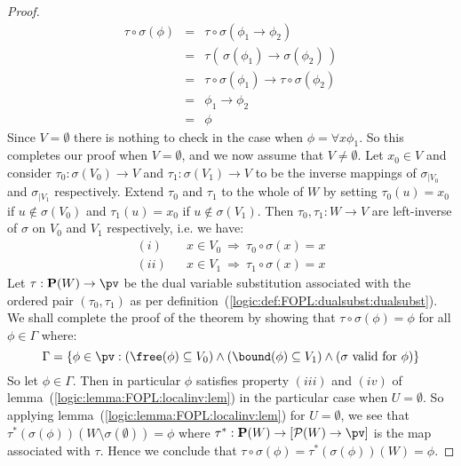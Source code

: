 \begin{proof}
    \begin{eqnarray*}
    \tau\circ\sigma(\phi)&=&\tau\circ\sigma(\phi_{1}\to\phi_{2})\\
    &=&\tau(\,\sigma(\phi_{1})\to\sigma(\phi_{2})\,)\\
    &=&\tau\circ\sigma(\phi_{1})\to\tau\circ\sigma(\phi_{2})\\
    &=&\phi_{1}\to\phi_{2}\\
    &=&\phi
    \end{eqnarray*}
Since $V=\emptyset$ there is nothing to check in the case when
$\phi=\forall x\phi_{1}$. So this completes our proof when
$V=\emptyset$, and we now assume that $V\neq\emptyset$. Let
$x_{0}\in V$ and consider $\tau_{0}:\sigma(V_{0})\to V$ and
$\tau_{1}:\sigma(V_{1})\to V$ to be the inverse mappings of
$\sigma_{|V_{0}}$ and $\sigma_{|V_{1}}$ respectively. Extend
$\tau_{0}$ and $\tau_{1}$ to the whole of $W$ by setting
$\tau_{0}(u)=x_{0}$ if $u\not\in\sigma(V_{0})$ and
$\tau_{1}(u)=x_{0}$ if $u\not\in\sigma(V_{1})$. Then $\tau_{0},
\tau_{1}:W\to V$ are left-inverse of $\sigma$ on $V_{0}$ and $V_{1}$
respectively, i.e. we have:
    \begin{eqnarray*}
    (i)&&x\in V_{0}\ \Rightarrow\ \tau_{0}\circ\sigma(x)=x\\
    (ii)&&x\in V_{1}\ \Rightarrow\ \tau_{1}\circ\sigma(x)=x
    \end{eqnarray*}
Let $\tau:{\bf P}(W)\to\pv$ be the dual variable substitution
associated with the ordered pair $(\tau_{0},\tau_{1})$ as per
definition~(\ref{logic:def:FOPL:dualsubst:dualsubst}). We shall
complete the proof of the theorem by showing that
$\tau\circ\sigma(\phi)=\phi$ for all $\phi\in\Gamma$ where:
    \[
    \Gamma=\{\phi\in\pv:(\free(\phi)\subseteq
    V_{0})\land(\bound(\phi)\subseteq V_{1})\land(\mbox{$\sigma$
    valid for $\phi$})\}
    \]
So let $\phi\in\Gamma$. Then in particular $\phi$ satisfies property
$(iii)$ and $(iv)$ of lemma~(\ref{logic:lemma:FOPL:localinv:lem}) in
the particular case when $U=\emptyset$. So applying
lemma~(\ref{logic:lemma:FOPL:localinv:lem}) for $U=\emptyset$, we
see that $\tau^{*}(\sigma(\phi))(W\setminus\sigma(\emptyset))=\phi$
where $\tau^{*}:{\bf P}(W)\to[{\cal P}(W)\to\pv]$ is the map
associated with $\tau$. Hence we conclude that
$\tau\circ\sigma(\phi)=\tau^{*}(\sigma(\phi))(W)=\phi$.
\end{proof}

